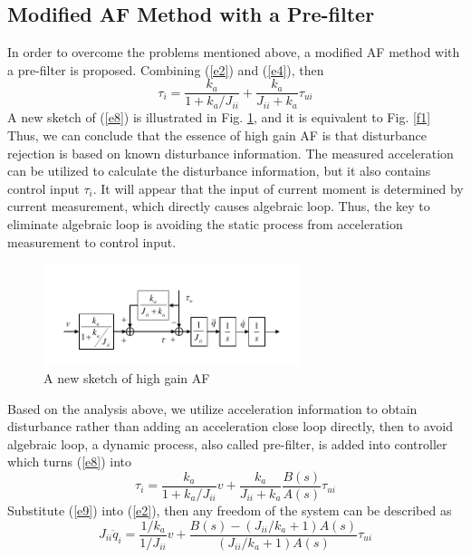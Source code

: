 \documentclass[letterpaper, 10 pt, conference]{ieeeconf}  %
\begin{document}
\subsection{Modified AF Method with a Pre-filter}
In order to overcome the problems mentioned above, a modified AF method with a pre-filter is proposed.
Combining (\ref{e2}) and (\ref{e4}), then
\begin{equation}
    \tau_{i} = \frac{k_a}{1+ k_a / J_{ii}} + \frac{k_a}{J_{ii}+k_a} \tau_{ui}
    \label{e8}
\end{equation}
A new sketch of (\ref{e8}) is illustrated in Fig. \ref{f2}, and it is equivalent to Fig. \ref{f1}
Thus, we can conclude that the essence of high gain AF is that disturbance rejection is based on known disturbance information.
The measured acceleration can be utilized to calculate the disturbance information, but it also contains control input $\tau_i$.
It will appear that the input of current moment is determined by current measurement, which directly causes algebraic loop.
Thus, the key to eliminate algebraic loop is avoiding the static process from acceleration measurement to control input.
\begin{figure}[h]
    \centering
    \includegraphics[width=2.95in]{illustrations/fig2.pdf}
    \caption{A new sketch of high gain AF}
    \label{f2}
\end{figure}

Based on the analysis above, we utilize acceleration information to obtain disturbance rather than adding an acceleration close loop directly, then to avoid algebraic loop, a dynamic process, also called pre-filter, is added into controller which turns (\ref{e8}) into
\begin{equation}
    \tau_i=\frac{k_a}{1+k_a / J_{ii}}v+\frac{k_a}{J_{ii}+k_a}\frac{B(s)}{A(s)}\tau_{ui}
    \label{e9}
\end{equation}
Substitute (\ref{e9}) into (\ref{e2}), then any freedom of the system can be described as
\begin{equation}
    J_{ii}\ddot{q}_i = \frac{1/k_a}{1/J_{ii}}v + \frac{B(s)-(J_{ii}/k_a+1)A(s)}{(J_{ii}/k_a+1)A(s)}\tau_{ui}
    \label{e10}
\end{equation}
\end{document}
